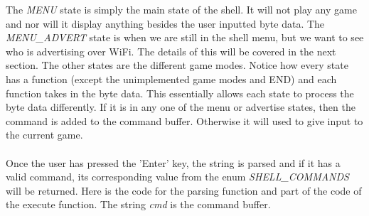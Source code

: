 \documentclass[a4paper, 12pt]{article}
\begin{document}
    The \textit{MENU} state is simply the main state of the shell. It will not
    play any game and nor will it display anything besides the user inputted
    byte data. The \textit{MENU\_ADVERT} state is when we are still in the shell
    menu, but we want to see who is advertising over WiFi. The details of this
    will be covered in the next section. The other states are the different
    game modes. Notice how every state has a function (except the 
    unimplemented game modes and END) and each function takes in the byte
    data. This essentially allows each state to process the byte data 
    differently. If it is in any one of the
    menu or advertise states, then the command is added to the command buffer.
    Otherwise it will used to give input to the current game.
    \\ \\
    Once the user has pressed the 'Enter' key, the string is parsed and if it
    has a valid command, its corresponding value from the enum
    \textit{SHELL\_COMMANDS} will be returned. Here is the code for the parsing
    function and part of the code of the execute function. The string
    \textit{cmd} is the command buffer.
\end{document}
